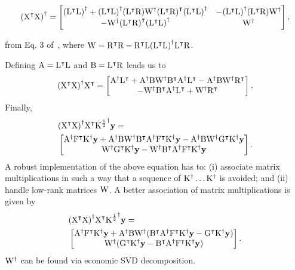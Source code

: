 \documentclass[twocolumn,draft]{article}
\begin{document}
\begin{strip}
	\begin{equation*}
		\pinv{(\trans{\rmX}\rmX)} =
		\begin{bmatrix}
			\pinv{(\trans{\rmL}\rmL)} + \pinv{(\trans{\rmL}\rmL)} (\trans{\rmL}\rmR)
				\pinv{\rmW} \trans{(\trans{\rmL}\rmR)} \pinv{(\trans{\rmL}\rmL)}
				& - \pinv{(\trans{\rmL}\rmL)} (\trans{\rmL}\rmR)
				\pinv{\rmW} \\
			- \pinv{\rmW} \trans{(\trans{\rmL}\rmR)}
			\pinv{(\trans{\rmL}\rmL)} & \pinv{\rmW}
		\end{bmatrix},
	\end{equation*}
\end{strip}
from Eq. 3 of~\cite{rohde1965generalized}, where
$\rmW = \trans{\rmR}\rmR - \trans{\rmR}\rmL\pinv{(\trans{\rmL}\rmL)}
\trans{\rmL}\rmR$.

Defining $\rmA = \trans{\rmL}\rmL$ and $\rmB = \trans{\rmL}\rmR$ leads us to
\begin{equation*}
	\pinv{(\trans{\rmX}\rmX)}\trans{\rmX} =
		\begin{bmatrix}
			\pinv{\rmA}\trans{\rmL}
			+ \pinv{\rmA}\rmB\pinv{\rmW}\trans{\rmB}\pinv{\rmA}\trans{\rmL}
			-\pinv{\rmA}\rmB\pinv{\rmW}\trans{\rmR}\\
			-\pinv{\rmW}\trans{\rmB}\pinv{\rmA}\trans{\rmL}
			+ \pinv{\rmW}\trans{\rmR}
		\end{bmatrix}.
\end{equation*}
Finally,
\begin{align*}
	&\pinv{(\trans{\rmX}\rmX)}\trans{\rmX} \pinv{\rmK^{\haf}}\bfy = \\
	&\begin{bmatrix}
		\pinv{\rmA}\trans{\rmF}\pinv{\rmK}\bfy
		+ \pinv{\rmA}\rmB\pinv{\rmW}\trans{\rmB}\pinv{\rmA}\trans{\rmF}\pinv{\rmK}\bfy
		-\pinv{\rmA}\rmB\pinv{\rmW}\trans{\rmG}\pinv{\rmK}\bfy \\
		\pinv{\rmW}\trans{\rmG}\pinv{\rmK}\bfy
		-\pinv{\rmW}\trans{\rmB}\pinv{\rmA}\trans{\rmF}\pinv{\rmK}\bfy
	\end{bmatrix}.
\end{align*}
A robust implementation of the above equation has to:
(i) associate matrix multiplications in such a way that a sequence of
$\pinv{\rmK}\dots\pinv{\rmK}$ is avoided;
and (ii) handle low-rank matrices $\rmW$.
A better association of matrix multiplications is given by
\begin{align*}
	&\pinv{(\trans{\rmX}\rmX)}\trans{\rmX} \pinv{\rmK^{\haf}}\bfy = \\
	&\begin{bmatrix}
		\pinv{\rmA}\trans{\rmF}\pinv{\rmK}\bfy
		+ \pinv{\rmA}\rmB\pinv{\rmW}(\trans{\rmB}\pinv{\rmA}\trans{\rmF}\pinv{\rmK}
		\bfy-\trans{\rmG}\pinv{\rmK}\bfy) \\
		\pinv{\rmW}(\trans{\rmG}\pinv{\rmK}\bfy
		-\trans{\rmB}\pinv{\rmA}\trans{\rmF}\pinv{\rmK}\bfy)
	\end{bmatrix}.
\end{align*}
$\pinv{\rmW}$ can be found via economic SVD decomposition.
\end{document}
